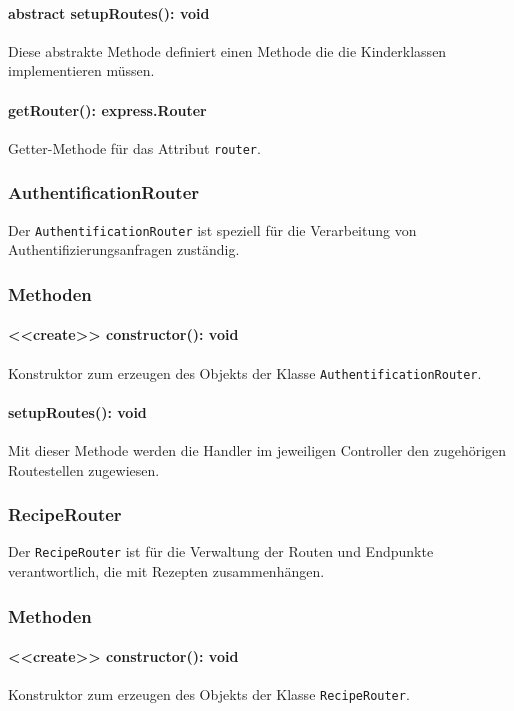 \documentclass{entwurfsheft}
\begin{document}
\paragraph{abstract setupRoutes(): void}
Diese abstrakte Methode definiert einen Methode die die Kinderklassen implementieren müssen.
\paragraph{getRouter(): express.Router}
Getter-Methode für das Attribut \texttt{router}.


\subsubsection{AuthentificationRouter}\label{sec:AuthentificationRouter}
Der \texttt{AuthentificationRouter} ist speziell für die Verarbeitung von Authentifizierungsanfragen zuständig.
\subsubsection*{Methoden}
\paragraph{<<create>> constructor(): void}
Konstruktor zum erzeugen des Objekts der Klasse \newline
\texttt{AuthentificationRouter}.
\paragraph{setupRoutes(): void}
Mit dieser Methode werden die Handler im jeweiligen Controller den zugehörigen Routestellen zugewiesen.

\subsubsection{RecipeRouter}\label{sec:RecipeRouter}
Der \texttt{RecipeRouter} ist für die Verwaltung der Routen und Endpunkte verantwortlich, die mit Rezepten zusammenhängen.
\subsubsection*{Methoden}
\paragraph{<<create>> constructor(): void}
Konstruktor zum erzeugen des Objekts der Klasse \newline
\texttt{RecipeRouter}.
\end{document}
